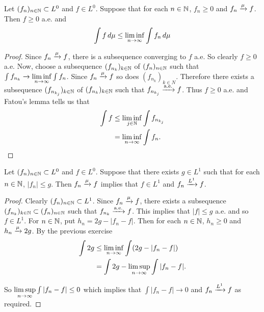 \documentclass{book}
\begin{document}
	\begin{ex}  
		Let $(f_n)_{n \in \mathbb{N}} \subset L^0$ and $f \in L^0$. Suppose that for each $n \in \mathbb{N}$, $f_n \geq 0$ and $f_n \xrightarrow{\mu} f$. Then $f \geq 0$ a.e. and $$\int f \, d \mu \leq \liminf \limits_{n \rightarrow \infty} \int f_n \, d \mu $$
	\end{ex}
	
	\begin{proof}
		Since $f_n \xrightarrow{\mu} f$, there is a subsequence converging to $f$ a.e. So clearly $f \geq 0$ a.e. Now, choose a subsequence $(f_{n_k})_{k \in \mathbb{N}}$ of $(f_n)_{n \in \mathbb{N}}$ such that $\int f_{n_k} \xrightarrow{} \liminf \limits_{n \rightarrow \infty} \int f_n$. Since $f_n \xrightarrow{\mu} f$ so does $(f_{n_k})_{k \in N}$. Therefore there exists a subsequence $(f_{n_{k_j}})_{k \in \mathbb{N}}$ of $(f_{n_k})_{k \in \mathbb{N}}$ such that $f_{n_{k_j}} \xrightarrow{\text{a.e.}} f$. Thus $f \geq 0 $ a.e. and Fatou's lemma tells us that 
		\begin{align*}
			\int f 
			&\leq \liminf_{j \in \mathbb{N}} \int f_{n_{k_j}}\\
			&= \liminf \limits_{n \rightarrow \infty} \int f_n.
		\end{align*}
	\end{proof}
	
	\begin{ex}  
		Let $(f_n)_{n \in \mathbb{N}} \subset L^0$ and $f \in L^0$. Suppose that there exists $g \in L^1$ such that for each $n \in \mathbb{N}$, $|f_n| \leq g$. Then $f_n \xrightarrow{\mu} f$ implies that $f \in L^1$ and $f_n \xrightarrow{L^1} f$. 
	\end{ex}
	
	\begin{proof}
		Clearly $(f_n)_{n \in \mathbb{N}} \subset L^1$. Since $f_n \xrightarrow{\mu} f$, there exists a subsequence $(f_{n_k})_{k \in \mathbb{N}} \subset (f_n)_{n \in \mathbb{N}}$ such that $f_{n_k} \xrightarrow{\text{a.e.}} f$. This implies that $|f| \leq g$ a.e. and so $f \in L^1$. For $n \in \mathbb{N}$, put $h_n = 2g - |f_n-f|$. Then for each $n \in \mathbb{N}$, $h_n \geq 0$ and $h_n \xrightarrow{\mu}2g$. By the previous exercise 
		\begin{align*}
			\int 2g 
			&\leq \liminf \limits_{n \rightarrow \infty} \int (2g - |f_n -f|)\\
			& = \int 2g - \limsup \limits_{n \rightarrow \infty} \int|f_n -f|.
		\end{align*}
		
		So $\limsup \limits_{n \rightarrow \infty} \int|f_n -f| \leq 0$ which implies that $\int|f_n -f| \rightarrow 0$ and $f_n \xrightarrow{L^1} f$ as required. 
	\end{proof}
	
\end{document}
